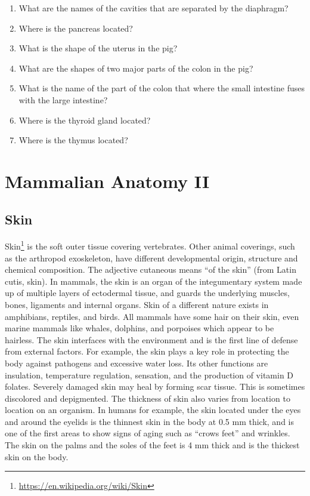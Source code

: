 \documentclass[]{book}
\providecommand{\tightlist}{%
  \setlength{\itemsep}{0pt}\setlength{\parskip}{0pt}}
\let\rmarkdownfootnote\footnote%
\def\footnote{\protect\rmarkdownfootnote}
\renewcommand{\href}[2]{#2\footnote{\url{#1}}}
\begin{document}
\begin{enumerate}
\def\labelenumi{\arabic{enumi}.}
\tightlist
\item
  What are the names of the cavities that are separated by the diaphragm?
\item
  Where is the pancreas located?
\item
  What is the shape of the uterus in the pig?
\item
  What are the shapes of two major parts of the colon in the pig?
\item
  What is the name of the part of the colon that where the small intestine fuses with the large intestine?
\item
  Where is the thyroid gland located?
\item
  Where is the thymus located?
\end{enumerate}

\hypertarget{mammalian-anatomy-ii}{%
\chapter{Mammalian Anatomy II}\label{mammalian-anatomy-ii}}

\hypertarget{skin}{%
\section{Skin}\label{skin}}

\href{https://en.wikipedia.org/wiki/Skin}{Skin} is the soft outer tissue covering vertebrates. Other animal coverings, such as the arthropod exoskeleton, have different developmental origin, structure and chemical composition. The adjective cutaneous means ``of the skin'' (from Latin cutis, skin). In mammals, the skin is an organ of the integumentary system made up of multiple layers of ectodermal tissue, and guards the underlying muscles, bones, ligaments and internal organs. Skin of a different nature exists in amphibians, reptiles, and birds. All mammals have some hair on their skin, even marine mammals like whales, dolphins, and porpoises which appear to be hairless. The skin interfaces with the environment and is the first line of defense from external factors. For example, the skin plays a key role in protecting the body against pathogens and excessive water loss. Its other functions are insulation, temperature regulation, sensation, and the production of vitamin D folates. Severely damaged skin may heal by forming scar tissue. This is sometimes discolored and depigmented. The thickness of skin also varies from location to location on an organism. In humans for example, the skin located under the eyes and around the eyelids is the thinnest skin in the body at 0.5 mm thick, and is one of the first areas to show signs of aging such as ``crows feet'' and wrinkles. The skin on the palms and the soles of the feet is 4 mm thick and is the thickest skin on the body.
\end{document}
